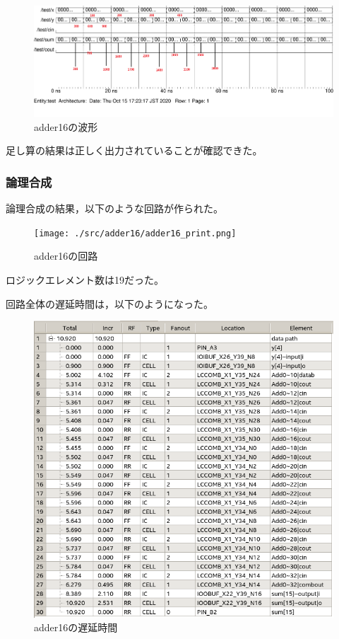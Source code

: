 \begin{figure}[H]
  \centering
  \includegraphics[width=\linewidth]{./src/adder16/adder16_wave21.png}
  \caption{adder16の波形}
\end{figure}

足し算の結果は正しく出力されていることが確認できた。

\subsubsection{論理合成}
論理合成の結果，以下のような回路が作られた。

\begin{figure}[H]
  \centering
  \texttt{[image: ./src/adder16/adder16\_print.png]}
  \caption{adder16の回路}
\end{figure}

ロジックエレメント数は19だった。

回路全体の遅延時間は，以下のようになった。

\begin{figure}[H]
  \centering
  \includegraphics[width=\linewidth]{./src/adder16/adder16Timing.png}
  \caption{adder16の遅延時間}
\end{figure}

